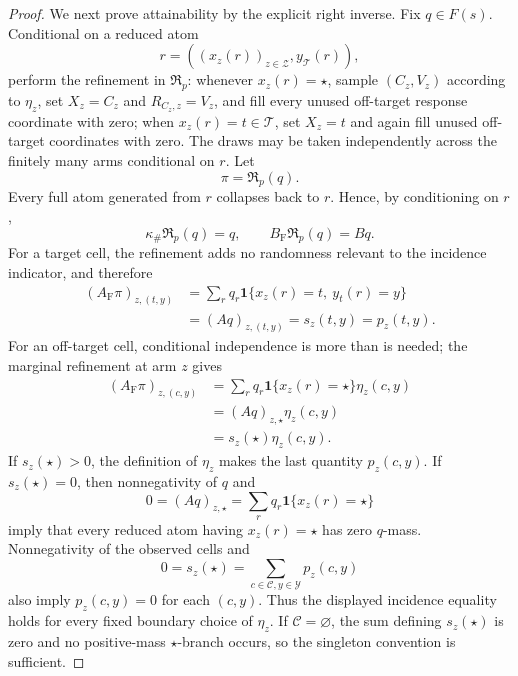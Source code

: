 \documentclass{article}
\begin{document}
\begin{proof}
We next prove attainability by the explicit right inverse.  Fix \(q\in F(s)\).  Conditional on a reduced atom
\[
r=((x_z(r))_{z\in\mathcal Z},y_{\mathcal T}(r)),
\]
perform the refinement in \(\mathfrak R_p\): whenever \(x_z(r)=\star\), sample \((C_z,V_z)\) according to \(\eta_z\), set \(X_z=C_z\) and \(R_{C_z,z}=V_z\), and fill every unused off-target response coordinate with zero; when \(x_z(r)=t\in\mathcal T\), set \(X_z=t\) and again fill unused off-target coordinates with zero.  The draws may be taken independently across the finitely many arms conditional on \(r\).  Let
\[
\pi=\mathfrak R_p(q).
\]
Every full atom generated from \(r\) collapses back to \(r\).  Hence, by conditioning on \(r\),
\[
\kappa_{\#}\mathfrak R_p(q)=q,
\qquad
B_{\mathrm F}\mathfrak R_p(q)=Bq.
\]
For a target cell, the refinement adds no randomness relevant to the incidence indicator, and therefore
\[
\begin{aligned}
(A_{\mathrm F}\pi)_{z,(t,y)}
&=\sum_rq_r\mathbf 1\{x_z(r)=t,\ y_t(r)=y\}\\
&=(Aq)_{z,(t,y)}=s_z(t,y)=p_z(t,y).
\end{aligned}
\]
For an off-target cell, conditional independence is more than is needed; the marginal refinement at arm \(z\) gives
\[
\begin{aligned}
(A_{\mathrm F}\pi)_{z,(c,y)}
&=\sum_rq_r\mathbf 1\{x_z(r)=\star\}\eta_z(c,y)\\
&=(Aq)_{z,\star}\eta_z(c,y)\\
&=s_z(\star)\eta_z(c,y).
\end{aligned}
\]
If \(s_z(\star)>0\), the definition of \(\eta_z\) makes the last quantity \(p_z(c,y)\).  If \(s_z(\star)=0\), then nonnegativity of \(q\) and
\[
0=(Aq)_{z,\star}
=\sum_rq_r\mathbf 1\{x_z(r)=\star\}
\]
imply that every reduced atom having \(x_z(r)=\star\) has zero \(q\)-mass.  Nonnegativity of the observed cells and
\[
0=s_z(\star)=\sum_{c\in\mathcal C,y\in\mathcal Y}p_z(c,y)
\]
also imply \(p_z(c,y)=0\) for each \((c,y)\).  Thus the displayed incidence equality holds for every fixed boundary choice of \(\eta_z\).  If \(\mathcal C=\varnothing\), the sum defining \(s_z(\star)\) is zero and no positive-mass \(\star\)-branch occurs, so the singleton convention is sufficient.


\end{proof}
\end{document}
